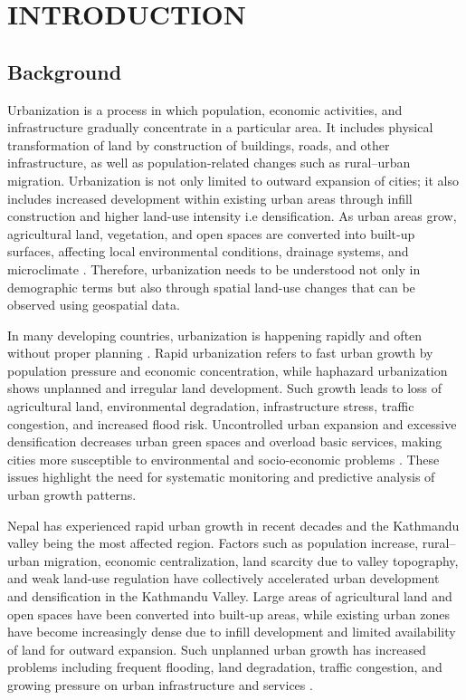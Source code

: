 \documentclass[main]{subfiles}
\begin{document}
\chapter{\MakeUppercase{INTRODUCTION}}


\section{Background}
Urbanization is a process in which population, economic activities, and infrastructure gradually concentrate in a particular area. It includes physical transformation of land by construction of buildings, roads, and other infrastructure, as well as population-related changes such as rural–urban migration. Urbanization is not only limited to outward expansion of cities; it also includes increased development within existing urban areas through infill construction and higher land-use intensity i.e densification. As urban areas grow, agricultural land, vegetation, and open spaces are converted into built-up surfaces, affecting local environmental conditions, drainage systems, and microclimate \cite{lu2014lulc}. Therefore, urbanization needs to be understood not only in demographic terms but also through spatial land-use changes that can be observed using geospatial data.

In many developing countries, urbanization is happening rapidly and often without proper planning \cite{thapa2012scenario}. Rapid urbanization refers to fast urban growth by population pressure and economic concentration, while haphazard urbanization shows unplanned and irregular land development. Such growth leads to loss of agricultural land, environmental degradation, infrastructure stress, traffic congestion, and increased flood risk. Uncontrolled urban expansion and excessive densification decreases urban green spaces and overload basic services, making cities more susceptible to environmental and socio-economic problems \cite{thapa2012scenario,environments4040072}. These issues highlight the need for systematic monitoring and predictive analysis of urban growth patterns.

Nepal has experienced rapid urban growth in recent decades and the Kathmandu valley being the most affected region. Factors such as population increase, rural–urban migration, economic centralization, land scarcity due to valley topography, and weak land-use regulation have collectively accelerated urban development and densification in the Kathmandu Valley. Large areas of agricultural land and open spaces have been converted into built-up areas, while existing urban zones have become increasingly dense due to infill development and limited availability of land for outward expansion. Such unplanned urban growth has increased problems including frequent flooding, land degradation, traffic congestion, and growing pressure on urban infrastructure and services \cite{environments4040072,su142315739}.
\end{document}
